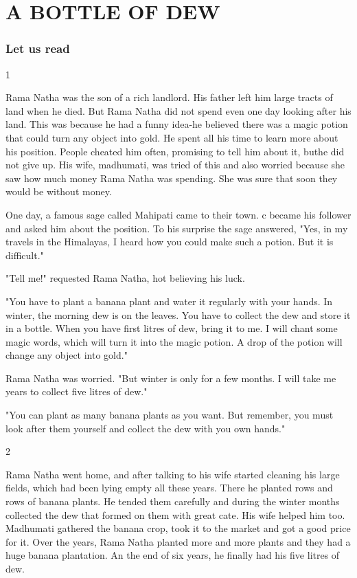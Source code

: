\chapter{A BOTTLE OF DEW}
\subsection{Let us read}
1
\par
\vspace{0.3in}
Rama Natha was the son of a rich landlord. His father left him large tracts of land when he died. But Rama Natha did not spend even one day looking after his land. This was because he had a funny idea-he believed there was a magic potion that could turn any object into gold. He spent all his time to learn more about his position. People cheated him often, promising to tell him about it, buthe did not give up. His wife, madhumati, was tried of this and also worried because she saw how much money Rama Natha was spending. She was sure that soon they would be without money.
\par
One day, a famous sage called Mahipati came to their town.  c became his follower and asked him about the position. To his surprise the sage answered, "Yes, in my travels in the Himalayas, I heard how you could make such a potion. But it is difficult."
\par
"Tell me!" requested Rama Natha, hot believing his luck.
\par
"You have to plant a banana plant and water it regularly with your hands. In winter, the morning dew is on the leaves. You have to collect the dew and store it in a bottle. When you have first litres of dew, bring it to me. I will chant some magic words, which will turn it into the magic potion. A drop of the potion will change any object into gold."
\par
Rama Natha was worried. "But winter is only for a few months. I will take me years to collect five litres of dew."
\par
"You can plant as many banana plants as you want. But remember, you must look after them yourself and collect the dew with you own hands."
\par
2
\par
\vspace{0.3in}
Rama Natha went home, and after talking to his wife started cleaning his large fields, which had been lying empty all these years. There he planted rows and rows of banana plants. He tended them carefully and during the winter months collected the dew that formed on them with great cate. His wife helped him too. Madhumati gathered the banana crop, took it to the market and got a good price for it. Over the years, Rama Natha planted more and more plants and they had a huge banana plantation. An the end of six years, he finally had his five litres of dew.
